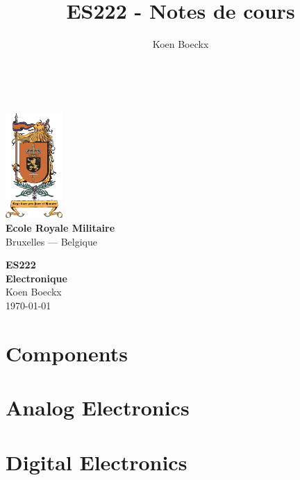 \documentclass[a4paper,11pt]{book}
\title{ES222 - Notes de cours}
\author{Koen Boeckx}
\begin{document}
	
\thispagestyle{empty}
~
\vspace{-2cm}
\begin{center}
	\includegraphics[height=4cm]{erm.jpg}\\[0.5cm]
	{\bf\huge{Ecole Royale Militaire}}\\[0.1cm]
	\Large{Bruxelles --- Belgique}
\end{center}
\vfill
\vfill
\begin{center}
	{\bf\Huge{ES222\\[0.2cm] Electronique}}\\[0.3cm]
	
	{\Large Koen Boeckx} \\[0.1cm]
	\vspace{0.6cm}
	{\large \today}
\end{center}
\vfill
\vfill
\vfill

\newpage


\tableofcontents
\nocite{*} %


\part{Components}



\part{Analog Electronics}



%




\part{Digital Electronics}



\end{document}
